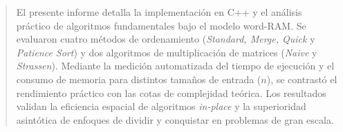 \begin{abstract}
El presente informe detalla la implementación en C++ y el análisis práctico de algoritmos fundamentales bajo el modelo word-RAM. Se evaluaron cuatro métodos de ordenamiento (\textit{Standard, Merge, Quick} y \textit{Patience Sort}) y dos algoritmos de multiplicación de matrices (\textit{Naive} y \textit{Strassen}). Mediante la medición automatizada del tiempo de ejecución y el consumo de memoria para distintos tamaños de entrada ($n$), se contrastó el rendimiento práctico con las cotas de complejidad teórica. Los resultados validan la eficiencia espacial de algoritmos \textit{in-place} y la superioridad asintótica de enfoques de dividir y conquistar en problemas de gran escala.
\end{abstract}
